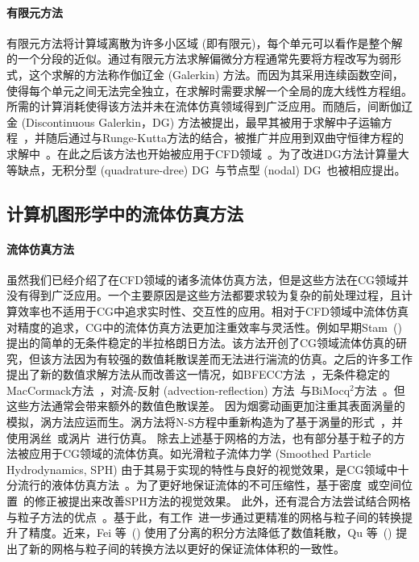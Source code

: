 \paragraph{有限元方法}
有限元方法将计算域离散为许多小区域 (即有限元)，每个单元可以看作是整个解的一个分段的近似。通过有限元方法求解偏微分方程通常先要将方程改写为弱形式，这个求解的方法称作伽辽金 (Galerkin) 方法。而因为其采用连续函数空间，使得每个单元之间无法完全独立，在求解时需要求解一个全局的庞大线性方程组。所需的计算消耗使得该方法并未在流体仿真领域得到广泛应用。而随后，间断伽辽金 (Discontinuous Galerkin，DG) 方法被提出，最早其被用于求解中子运输方程~\cite{reed1973triangular}，并随后通过与Runge-Kutta方法的结合，被推广并应用到双曲守恒律方程的求解中~\cite{cockburn1989tvb2, cockburn1989tvb3, cockburn1990runge, cockburn2001runge}。在此之后该方法也开始被应用于CFD领域~\cite{Zienkiewicz-2013, bassi1997high, lomtev1999discontinuous}。为了改进DG方法计算量大等缺点，无积分型 (quadrature-dree) DG~\cite{atkins1998quadrature}与节点型 (nodal) DG~\cite{hesthaven2007nodal}也被相应提出。

\subsection{计算机图形学中的流体仿真方法}
\paragraph{流体仿真方法}
虽然我们已经介绍了在CFD领域的诸多流体仿真方法，但是这些方法在CG领域并没有得到广泛应用。一个主要原因是这些方法都要求较为复杂的前处理过程，且计算效率也不适用于CG中追求实时性、交互性的应用。相对于CFD领域中流体仿真对精度的追求，CG中的流体仿真方法更加注重效率与灵活性。例如早期Stam~(\citeyear{Stam-1999}) 提出的简单的无条件稳定的半拉格朗日方法。该方法开创了CG领域流体仿真的研究，但该方法因为有较强的数值耗散误差而无法进行湍流的仿真。之后的许多工作提出了新的数值求解方法从而改善这一情况，如BFECC方法~\cite{Kim-2005}，无条件稳定的MacCormack方法~\cite{Selle-2008}，对流-反射 (advection-reflection) 方法~\cite{Zehnder-2018}与BiMocq$^2$方法~\cite{Qu-2019}。但这些方法通常会带来额外的数值色散误差。
因为烟雾动画更加注重其表面涡量的模拟，涡方法应运而生。涡方法将N-S方程中重新构造为了基于涡量的形式~\cite{Park-2005, Selle-2005}，并使用涡丝~\cite{Angelidis-2005, Weissmann-2010}或涡片~\cite{Pfaff-2012, Zhang-2014, Zhang-2015}进行仿真。
除去上述基于网格的方法，也有部分基于粒子的方法被应用于CG领域的流体仿真。如光滑粒子流体力学 (Smoothed Particle Hydrodynamics, SPH) 由于其易于实现的特性与良好的视觉效果，是CG领域中十分流行的液体仿真方法~\cite{Desbrun-1996,Muller-2003,Adams-2007,Becker-2007,Ihmsen-2014-1}。为了更好地保证流体的不可压缩性，基于密度~\cite{Solenthaler-2009, Bender-2015, Ihmsen-2014-2}或空间位置~\cite{Macklin-2013}的修正被提出来改善SPH方法的视觉效果。
此外，还有混合方法尝试结合网格与粒子方法的优点~\cite{Harlow-1962, Brackbill-1986, Foster-1996, Zhu-2005}。基于此，有工作~\cite{Jiang-2015, Fu-2017}进一步通过更精准的网格与粒子间的转换提升了精度。近来，Fei 等~(\citeyear{Fei-2021}) 使用了分离的积分方法降低了数值耗散，Qu 等~(\citeyear{Qu-2022}) 提出了新的网格与粒子间的转换方法以更好的保证流体体积的一致性。

